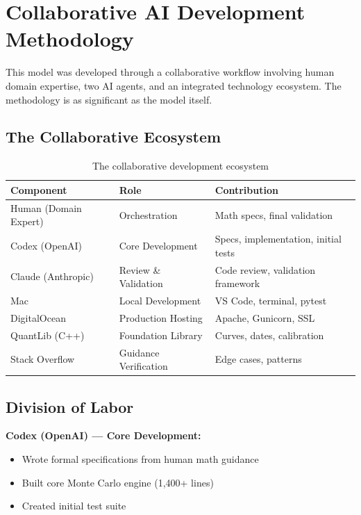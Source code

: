 \documentclass[conference]{IEEEtran}
\begin{document}
\section{Collaborative AI Development Methodology}

This model was developed through a collaborative workflow involving human domain expertise, two AI agents, and an integrated technology ecosystem. The methodology is as significant as the model itself.

\subsection{The Collaborative Ecosystem}

\begin{table}[H]
\centering
\begin{tabularx}{\columnwidth}{>{\raggedright\arraybackslash}X>{\raggedright\arraybackslash}X>{\raggedright\arraybackslash}X}
\toprule
\textbf{Component} & \textbf{Role} & \textbf{Contribution} \\
\midrule
Human (Domain Expert) & Orchestration & Math specs, final validation \\
Codex (OpenAI) & Core Development & Specs, implementation, initial tests \\
Claude (Anthropic) & Review \& Validation & Code review, validation framework \\
\midrule
Mac & Local Development & VS Code, terminal, pytest \\
DigitalOcean & Production Hosting & Apache, Gunicorn, SSL \\
QuantLib (C++) & Foundation Library & Curves, dates, calibration \\
Stack Overflow & Guidance Verification & Edge cases, patterns \\
\bottomrule
\end{tabularx}
\caption{The collaborative development ecosystem}
\end{table}

\subsection{Division of Labor}

\textbf{Codex (OpenAI) --- Core Development:}
\begin{itemize}
    \item Wrote formal specifications from human math guidance
    \item Built core Monte Carlo engine (1,400+ lines)
    \item Created initial test suite
\end{itemize}
\end{document}
